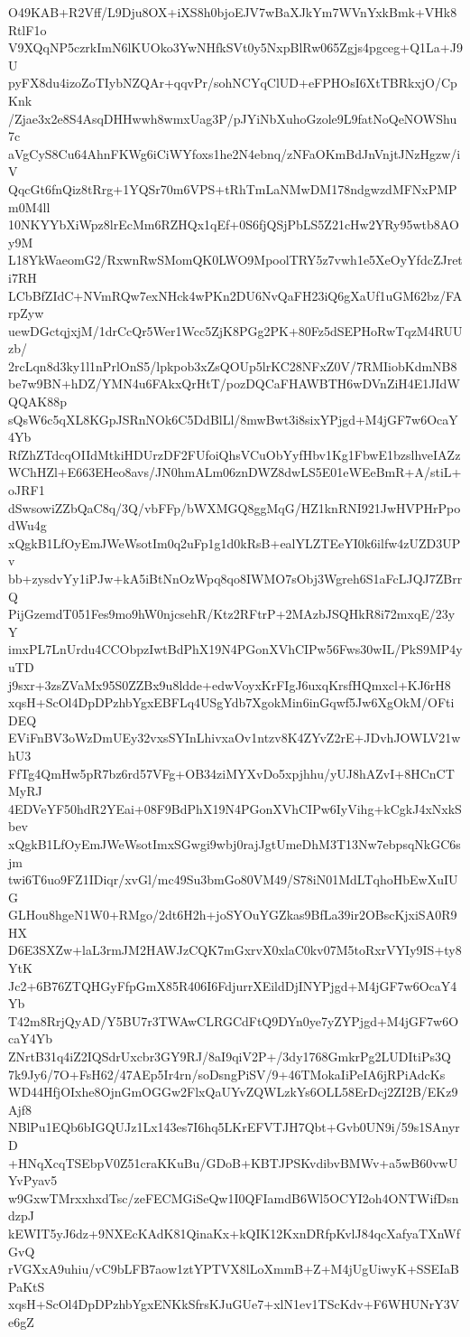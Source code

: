 O49KAB+R2Vff/L9Dju8OX+iXS8h0bjoEJV7wBaXJkYm7WVnYxkBmk+VHk8RtlF1o
V9XQqNP5czrkImN6lKUOko3YwNHfkSVt0y5NxpBlRw065Zgjs4pgceg+Q1La+J9U
pyFX8du4izoZoTIybNZQAr+qqvPr/sohNCYqClUD+eFPHOsI6XtTBRkxjO/CpKnk
/Zjae3x2e8S4AsqDHHwwh8wmxUag3P/pJYiNbXuhoGzole9L9fatNoQeNOWShu7c
aVgCyS8Cu64AhnFKWg6iCiWYfoxs1he2N4ebnq/zNFaOKmBdJnVnjtJNzHgzw/iV
QqcGt6fnQiz8tRrg+1YQSr70m6VPS+tRhTmLaNMwDM178ndgwzdMFNxPMPm0M4ll
10NKYYbXiWpz8lrEcMm6RZHQx1qEf+0S6fjQSjPbLS5Z21cHw2YRy95wtb8AOy9M
L18YkWaeomG2/RxwnRwSMomQK0LWO9MpoolTRY5z7vwh1e5XeOyYfdcZJreti7RH
LCbBfZIdC+NVmRQw7exNHck4wPKn2DU6NvQaFH23iQ6gXaUf1uGM62bz/FArpZyw
uewDGctqjxjM/1drCcQr5Wer1Wcc5ZjK8PGg2PK+80Fz5dSEPHoRwTqzM4RUUzb/
2rcLqn8d3ky1l1nPrlOnS5/lpkpob3xZsQOUp5lrKC28NFxZ0V/7RMIiobKdmNB8
be7w9BN+hDZ/YMN4u6FAkxQrHtT/pozDQCaFHAWBTH6wDVnZiH4E1JIdWQQAK88p
sQsW6c5qXL8KGpJSRnNOk6C5DdBlLl/8mwBwt3i8sixYPjgd+M4jGF7w6OcaY4Yb
RfZhZTdcqOIIdMtkiHDUrzDF2FUfoiQhsVCuObYyfHbv1Kg1FbwE1bzslhveIAZz
WChHZl+E663EHeo8avs/JN0hmALm06znDWZ8dwLS5E01eWEeBmR+A/stiL+oJRF1
dSwsowiZZbQaC8q/3Q/vbFFp/bWXMGQ8ggMqG/HZ1knRNI921JwHVPHrPpodWu4g
xQgkB1LfOyEmJWeWsotIm0q2uFp1g1d0kRsB+ealYLZTEeYI0k6ilfw4zUZD3UPv
bb+zysdvYy1iPJw+kA5iBtNnOzWpq8qo8IWMO7sObj3Wgreh6S1aFcLJQJ7ZBrrQ
PijGzemdT051Fes9mo9hW0njcsehR/Ktz2RFtrP+2MAzbJSQHkR8i72mxqE/23yY
imxPL7LnUrdu4CCObpzIwtBdPhX19N4PGonXVhCIPw56Fws30wIL/PkS9MP4yuTD
j9sxr+3zsZVaMx95S0ZZBx9u8ldde+edwVoyxKrFIgJ6uxqKrsfHQmxcl+KJ6rH8
xqsH+ScOl4DpDPzhbYgxEBFLq4USgYdb7XgokMin6inGqwf5Jw6XgOkM/OFtiDEQ
EViFnBV3oWzDmUEy32vxsSYInLhivxaOv1ntzv8K4ZYvZ2rE+JDvhJOWLV21whU3
FfTg4QmHw5pR7bz6rd57VFg+OB34ziMYXvDo5xpjhhu/yUJ8hAZvI+8HCnCTMyRJ
4EDVeYF50hdR2YEai+08F9BdPhX19N4PGonXVhCIPw6IyVihg+kCgkJ4xNxkSbev
xQgkB1LfOyEmJWeWsotImxSGwgi9wbj0rajJgtUmeDhM3T13Nw7ebpsqNkGC6sjm
twi6T6uo9FZ1IDiqr/xvGl/mc49Su3bmGo80VM49/S78iN01MdLTqhoHbEwXuIUG
GLHou8hgeN1W0+RMgo/2dt6H2h+joSYOuYGZkas9BfLa39ir2OBscKjxiSA0R9HX
D6E3SXZw+laL3rmJM2HAWJzCQK7mGxrvX0xlaC0kv07M5toRxrVYIy9IS+ty8YtK
Jc2+6B76ZTQHGyFfpGmX85R406I6FdjurrXEildDjINYPjgd+M4jGF7w6OcaY4Yb
T42m8RrjQyAD/Y5BU7r3TWAwCLRGCdFtQ9DYn0ye7yZYPjgd+M4jGF7w6OcaY4Yb
ZNrtB31q4iZ2IQSdrUxcbr3GY9RJ/8aI9qiV2P+/3dy1768GmkrPg2LUDItiPs3Q
7k9Jy6/7O+FsH62/47AEp5Ir4rn/soDsngPiSV/9+46TMokaIiPeIA6jRPiAdcKs
WD44HfjOIxhe8OjnGmOGGw2FlxQaUYvZQWLzkYs6OLL58ErDcj2ZI2B/EKz9Ajf8
NBlPu1EQb6bIGQUJz1Lx143es7I6hq5LKrEFVTJH7Qbt+Gvb0UN9i/59s1SAnyrD
+HNqXcqTSEbpV0Z51craKKuBu/GDoB+KBTJPSKvdibvBMWv+a5wB60vwUYvPyav5
w9GxwTMrxxhxdTsc/zeFECMGiSeQw1I0QFIamdB6Wl5OCYI2oh4ONTWifDsndzpJ
kEWIT5yJ6dz+9NXEcKAdK81QinaKx+kQIK12KxnDRfpKvlJ84qcXafyaTXnWfGvQ
rVGXxA9uhiu/vC9bLFB7aow1ztYPTVX8lLoXmmB+Z+M4jUgUiwyK+SSEIaBPaKtS
xqsH+ScOl4DpDPzhbYgxENKkSfrsKJuGUe7+xlN1ev1TScKdv+F6WHUNrY3Ve6gZ
